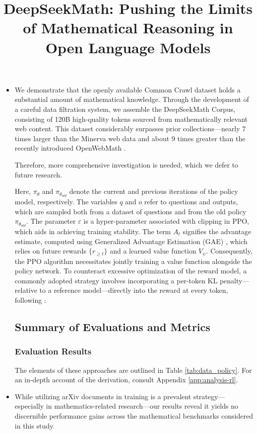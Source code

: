 \title{DeepSeekMath: Pushing the Limits of Mathematical Reasoning in Open Language Models}
\begin{itemize}[topsep=0pt]
    \item We demonstrate that the openly available Common Crawl dataset holds a substantial amount of mathematical knowledge. Through the development of a careful data filtration system, we assemble the DeepSeekMath Corpus, consisting of 120B high-quality tokens sourced from mathematically relevant web content. This dataset considerably surpasses prior collections—nearly 7 times larger than the Minerva web data \citep{minerva} and about 9 times greater than the recently introduced OpenWebMath \citep{openwebmath}.

Therefore, more comprehensive investigation is needed, which we defer to future research.

Here, $\pi_{\theta}$ and $\pi_{\theta_{old}}$ denote the current and previous iterations of the policy model, respectively. The variables $q$ and $o$ refer to questions and outputs, which are sampled both from a dataset of questions and from the old policy $\pi_{\theta_{old}}$. The parameter $\varepsilon$ is a hyper-parameter associated with clipping in PPO, which aids in achieving training stability. The term $A_t$ signifies the advantage estimate, computed using Generalized Advantage Estimation (GAE) \citep{gae}, which relies on future rewards $\{r_{\ge t}\}$ and a learned value function $V_{\psi}$. Consequently, the PPO algorithm necessitates jointly training a value function alongside the policy network. To counteract excessive optimization of the reward model, a commonly adopted strategy involves incorporating a per-token KL penalty—relative to a reference model—directly into the reward at every token, following \citep{ouyang2022training}:

\subsection{Summary of Evaluations and Metrics}

\subsubsection{Evaluation Results}

The elements of these approaches are outlined in Table \ref{tab:data_policy}. For an in-depth account of the derivation, consult Appendix \ref{app:analysis-rl}.

    \item While utilizing arXiv documents in training is a prevalent strategy—especially in mathematics-related research—our results reveal it yields no discernible performance gains across the mathematical benchmarks considered in this study.
\end{itemize}

